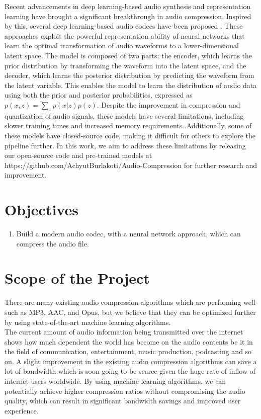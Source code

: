 \documentclass[12pt]{report}
\begin{document}
Recent advancements in deep learning-based audio synthesis and representation learning \cite{biswas2020audio, van2016wavenet, kleijn2018wavenet, garbacea2019low, kalchbrenner2018efficient, oord2018parallel} have brought a significant breakthrough in audio compression. Inspired by this, several deep learning-based audio codecs have been proposed \cite{zhen2019cascaded, zeghidour2021soundstream, chorowski2019unsupervised}. These approaches exploit the powerful representation ability of neural networks that learn the optimal transformation of audio waveforms to a lower-dimensional latent space. The model is composed of two parts: the encoder, which learns the prior distribution by transforming the waveform into the latent space, and the decoder, which learns the posterior distribution by predicting the waveform from the latent variable. This enables the model to learn the distribution of audio data using both the prior and posterior probabilities, expressed as $p(x,z) = \sum_{z} p(x|z) p(z)$. Despite the improvement in compression and quantization of audio signals, these models have several limitations, including slower training times and increased memory requirements. Additionally, some of these models have closed-source code, making it difficult for others to explore the pipeline further. In this work, we aim to address these limitations by releasing our open-source code and pre-trained models at https://github.com/AchyutBurlakoti/Audio-Compression for further research and improvement.

\section{Objectives}
\begin{enumerate}
    \item Build a modern audio codec, with a neural network approach, which can compress the audio file.
\end{enumerate}

\section{Scope of the Project}
There are many existing audio compression algorithms which are performing well such as MP3, AAC, and Opus, but we believe that they can be optimized further by using state-of-the-art machine learning algorithms. \\
The current amount of audio information being transmitted over the internet shows how much dependent the world has become on the audio contents be it in the field of communication, entertainment, music production, podcasting and so on. A slight improvement in the existing audio compression algorithms can save a lot of bandwidth which is soon going to be scarce given the huge rate of inflow of internet users worldwide. By using machine learning algorithms, we can potentially achieve higher compression ratios without compromising the audio quality, which can result in significant bandwidth savings and improved user experience.
\end{document}
